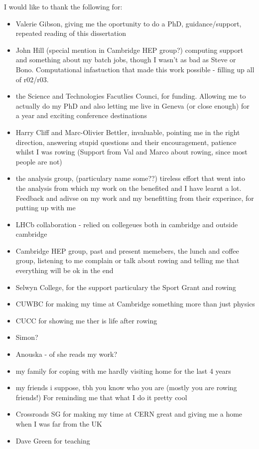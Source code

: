 I would like to thank the following for:
\begin{itemize}
\item Valerie Gibson, giving me the oportunity to do a PhD, guidance/support, repeated reading of this dissertation
\item John Hill (special mention in Cambridge HEP group?) computing support and something about my batch jobs, though I wasn't as bad as Steve or Bono. Computational infastuction that made this work possible - filling up all of r02/r03.
\item the Science and Technologies Facutlies Counci, for funding. Allowing me to actually do my PhD and also letting me live in Geneva (or close enough) for a year and exciting conference destinations
\item Harry Cliff and Marc-Olivier Bettler, invaluable, pointing me in the right direction, answering stupid questions and their encouragement, patience whilst I was rowing (Support from Val and Marco about rowing, since most people are not)
\item the \bmumu analysis group, (particulary name some??) tireless effort that went into the \BF analysis from which my work on the \el benefited and I have learnt a lot. Feedback and adivse on my work and my benefitting from their experince, for putting up with me
\item LHCb collaboration - relied on collegeues both in cambridge and outside cambridge
\item Cambridge HEP group, past and present memebers, the lunch and coffee group, listening to me complain or talk about rowing and telling me that everything will be ok in the end
\item Selwyn College, for the support particulary the Sport Grant and rowing
\item CUWBC for making my time at Cambridge something more than just physics
\item CUCC for showing me ther is life after rowing
\item Simon?
\item Anouska - of she reads my work?
\item my family for coping with me hardly visiting home for the last 4 years
\item my friends i suppose, tbh you know who you are (mostly you are rowing friends!) For reminding me that what I do it pretty cool
\item Crossroads SG for making my time at CERN great and giving me a home when I was far from the UK
\item Dave Green for teaching
\end{itemize}

